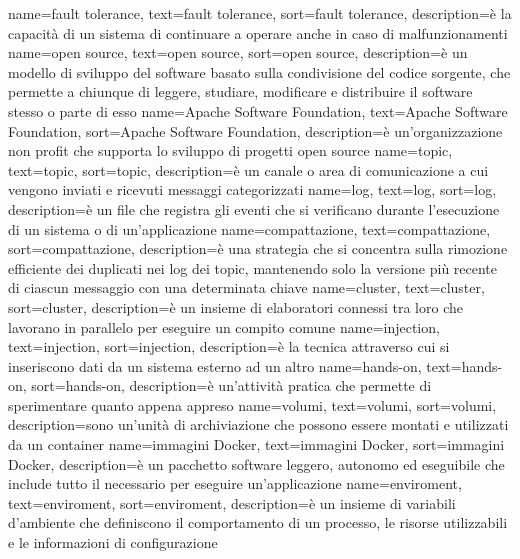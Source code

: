 {
    name={fault tolerance},
    text=fault tolerance,
    sort=fault tolerance,
    description={è la capacità di un sistema di continuare a operare anche in caso di malfunzionamenti}
}
{
    name={open source},
    text=open source,
    sort=open source,
    description={è un modello di sviluppo del software basato sulla condivisione del codice sorgente, che permette a chiunque di leggere, studiare, modificare e distribuire il software stesso o parte di esso}
}
{
    name={Apache Software Foundation},
    text=Apache Software Foundation,
    sort=Apache Software Foundation,
    description={è un'organizzazione non profit che supporta lo sviluppo di progetti open source}
}
{
    name={topic},
    text=topic,
    sort=topic,
    description={è un canale o area di comunicazione a cui vengono inviati e ricevuti messaggi categorizzati}
}
{
    name={log},
    text=log,
    sort=log,
    description={è un file che registra gli eventi che si verificano durante l'esecuzione di un sistema o di un'applicazione}
}
{
    name={compattazione},
    text=compattazione,
    sort=compattazione,
    description={è una strategia che si concentra sulla rimozione efficiente dei duplicati nei log dei topic, mantenendo solo la versione più recente di ciascun messaggio con una determinata chiave}
}
{
    name={cluster},
    text=cluster,
    sort=cluster,
    description={è un insieme di elaboratori connessi tra loro che lavorano in parallelo per eseguire un compito comune}
}
{
    name={injection},
    text=injection,
    sort=injection,
    description={è la tecnica attraverso cui si inseriscono dati da un sistema esterno ad un altro}
}
{
    name={hands-on},
    text=hands-on,
    sort=hands-on,
    description={è un'attività pratica che permette di sperimentare quanto appena appreso}
}
{
    name={volumi},
    text=volumi,
    sort=volumi,
    description={sono un'unità di archiviazione che possono essere montati e utilizzati da un container}
}
{
    name={immagini Docker},
    text=immagini Docker,
    sort=immagini Docker,
    description={è un pacchetto software leggero, autonomo ed eseguibile che include tutto il necessario per eseguire un'applicazione}
}
{
    name={enviroment},
    text=enviroment,
    sort=enviroment,
    description={è un insieme di variabili d'ambiente che definiscono il comportamento di un processo, le risorse utilizzabili e le informazioni di configurazione}
}
